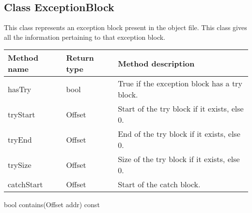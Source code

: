 \subsection{Class ExceptionBlock}\label{ExceptionBlock}
This class represents an exception block present in the object file. This class gives all the information pertaining to that exception block.

\begin{tabular}{|p{1.25in}|p{1in}|p{3.25in}|}
	\hline
	Method name & Return type & Method description \\
	\hline
	hasTry & bool & True if the exception block has a try block. \\
	tryStart & Offset & Start of the try block if it exists, else 0. \\
	tryEnd & Offset & End of the try block if it exists, else 0. \\
	trySize & Offset & Size of the try block if it exists, else 0. \\
	catchStart & Offset & Start of the catch block. \\
	\hline
\end{tabular} 


\begin{apient}
bool contains(Offset addr) const
\end{apient}

